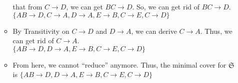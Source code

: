 \documentclass[12pt]{article}
\begin{document}
\begin{enumerate}
\begin{itemize}
            that from $C \longrightarrow D$, we can get $BC \longrightarrow D$.
            So, we can get rid of $BC \longrightarrow D$. \\
            $\{AB \longrightarrow D, C \longrightarrow A, D \longrightarrow A, E
            \longrightarrow B, C \longrightarrow E, C \longrightarrow D\}$
      \item By Transitivity on $C \longrightarrow D$ and $D \longrightarrow A$,
            we can derive $C \longrightarrow A$. Thus, we can get rid of $C
            \longrightarrow A$. \\
            $\{AB \longrightarrow D, D \longrightarrow A, E \longrightarrow B, C
            \longrightarrow E, C \longrightarrow D\}$
      \item From here, we cannot ``reduce'' anymore. Thus, the minimal cover for
            $\mathfrak{S}$ is $\{AB \longrightarrow D, D \longrightarrow A, E
            \longrightarrow B, C \longrightarrow E, C \longrightarrow D\}$
    \end{itemize}
  
  

\end{enumerate}
\end{document}
